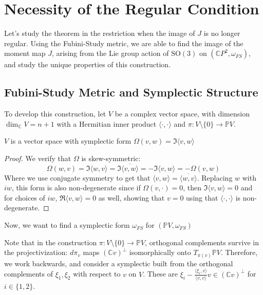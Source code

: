 \section{Necessity of the Regular Condition}
Let's study the theorem in the restriction when the image of $J$ is no longer regular. Using the Fubini-Study metric, we are able to find the image of the moment map $J$, arising from the Lie group action of $\mathrm{SO}(3)$ on $(\mathbb{C}P^{2}, \omega_{FS})$, and study the unique properties of this construction.

\subsection{Fubini-Study Metric and Symplectic Structure}

To develop this construction, let $V$ be a complex vector space, with dimension $\dim_{\mathbb{C}} V = n+1$ with a Hermitian inner product $\langle \cdot, \cdot \rangle$ and $\pi: V \setminus \{0\} \to \mathbb{P}V$. 

\begin{lemma}
$V$ is a vector space with symplectic form $\Omega(v,w) = \Im \langle v, w \rangle$
\end{lemma}

\begin{proof}
We verify that $\Omega$ is skew-symmetric:
\begin{equation}
\Omega(w, v) = \Im \langle w, v \rangle = \Im \overline{\langle v, w \rangle} = - \Im \langle v, w \rangle = - \Omega(v,w)
\end{equation}
Where we use conjugate symmetry to get that $\langle v, w \rangle = \overline{\langle w, v \rangle}$. Replacing $w$ with $iw$, this form is also non-degenerate since if $\Omega(v, \cdot) = 0$, then $\Im \langle v, w \rangle = 0$ and for choices of $iw$, $\Re \langle v, w \rangle = 0$ as well, showing that $v = 0$ using that $\langle \cdot, \cdot \rangle$ is non-degenerate.
\end{proof}

\begin{remark}
Now, we want to find a symplectic form $\omega_{FS}$ for $(\mathbb{P} V, \omega_{FS})$
\end{remark}

Note that in the construction $\pi: V \setminus \{0\} \to \mathbb{P} V$, orthogonal complements survive in the projectivization: $d\pi_{v}$ maps $(\mathbb{C} v)^{\perp}$ isomorphically onto $T_{\pi(v)} \mathbb{P}V$. Therefore, we work backwards, and consider a symplectic built from the orthogonal complements of $\xi_{1}, \xi_{2}$ with respect to $v$ on $V$. These are $\xi_{i} - \frac{\langle \xi_{i}, v \rangle}{\langle v, v \rangle}v \in (\mathbb{C} v)^{\perp}$ for $i \in \{1,2 \}$. 

